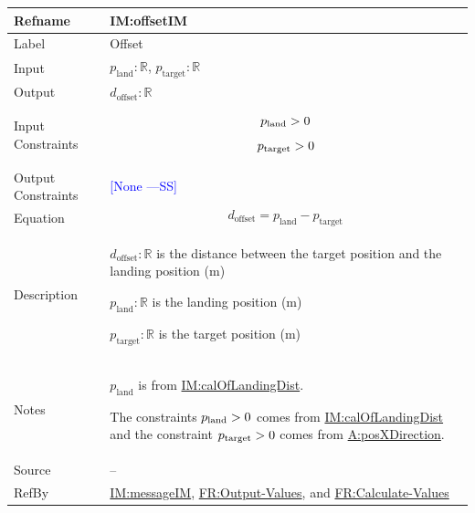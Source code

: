 \documentclass[12pt]{article}
\newcommand{\authornote}[3]{\textcolor{#1}{[#3 ---#2]}}
\newcommand{\authornote}[3]{}
\newcommand{\wss}[1]{\authornote{blue}{SS}{#1}}
\newcommand{\gt}{\ensuremath >}
\begin{document}
\medskip
\noindent
\begin{minipage}{\textwidth}
\begin{tabular}{>{\raggedright}p{}>{\raggedright\arraybackslash}p{}}
\toprule \textbf{Refname} & \textbf{IM:offsetIM}
\label{IM:offsetIM}
\\ \midrule
Label & Offset
        
\\ \midrule
Input & ${p_{\text{land}}}: \mathbb{R}$, ${p_{\text{target}}}: \mathbb{R}$
        
\\ \midrule
Output & ${d_{\text{offset}}}: \mathbb{R}$
         
\\ \midrule
Input Constraints & \begin{displaymath}
                    {p_{\text{land}}}\gt{}0
                    \end{displaymath}
                    \begin{displaymath}
                    {p_{\text{target}}}\gt{}0
                    \end{displaymath}
\\ \midrule
Output Constraints & \wss{None}
\\ \midrule
Equation & \begin{displaymath}
           {d_{\text{offset}}}={p_{\text{land}}}-{p_{\text{target}}}
           \end{displaymath}
\\ \midrule
Description & \begin{symbDescription}
              \item{${d_{\text{offset}}}: \mathbb{R}$ is the distance between the target position and the landing position (${\text{m}}$)}
              \item{${p_{\text{land}}}: \mathbb{R}$ is the landing position (${\text{m}}$)}
              \item{${p_{\text{target}}}: \mathbb{R}$ is the target position (${\text{m}}$)}
              \end{symbDescription}
\\ \midrule
Notes & ${p_{\text{land}}}$ is from \hyperref[IM:calOfLandingDist]{IM:calOfLandingDist}.
        
        The constraints ${p_{\text{land}}}\gt{}0$ comes from \hyperref[IM:calOfLandingDist]{IM:calOfLandingDist} and the constraint ${p_{\text{target}}}\gt{}0$ comes from \hyperref[posXDirection]{A:posXDirection}.
        
\\ \midrule
Source & --
         
\\ \midrule
RefBy & \hyperref[IM:messageIM]{IM:messageIM}, \hyperref[outputValues]{FR:Output-Values}, and \hyperref[calcValues]{FR:Calculate-Values}
        
\\ \bottomrule
\end{tabular}
\end{minipage}
\end{document}
